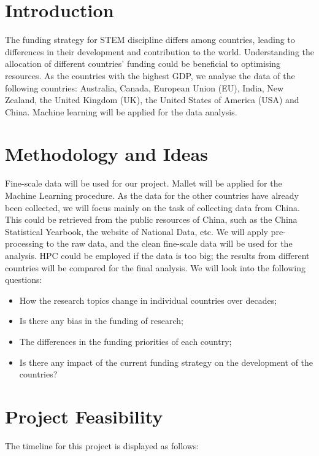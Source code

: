 \documentclass[11pt, oneside]{article}   	%
\begin{document}
\section{Introduction}

The funding strategy for STEM discipline differs among countries, leading to differences in their development and contribution to the world. Understanding the allocation of different countries' funding could be beneficial to optimising resources. As the countries with the highest GDP, we analyse the data of the following countries: Australia, Canada, European Union (EU), India, New Zealand, the United Kingdom (UK), the United States of America (USA) and China. Machine learning will be applied for the data analysis. 

\section{Methodology and Ideas}
Fine-scale data will be used for our project. Mallet will be applied for the Machine Learning procedure. As the data for the other countries have already been collected, we will focus mainly on the task of collecting data from China. This could be retrieved from the public resources of China, such as the China Statistical Yearbook, the website of National Data, etc. We will apply pre-processing to the raw data, and the clean fine-scale data will be used for the analysis. HPC could be employed if the data is too big; the results from different countries will be compared for the final analysis.
\bigbreak
\noindent We will look into the following questions:
\begin{itemize}
\item How the research topics change in individual countries over decades; 
\item Is there any bias in the funding of research;
\item The differences in the funding priorities of each country;
\item Is there any impact of the current funding strategy on the development of the countries?
\end{itemize}

\section{Project Feasibility}

The timeline for this project is displayed as follows:
\end{document}
